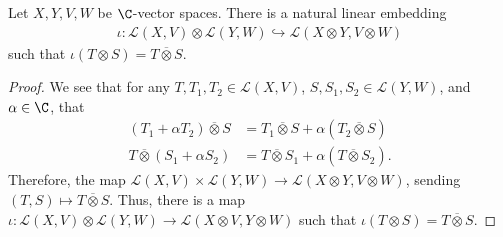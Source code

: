 \begin{proposition}
  Let $X,Y,V,W$ be $\C$-vector spaces. There is a natural linear embedding
  \begin{align*}
    \iota\colon \mathcal{L}\left( X,V \right)\otimes \mathcal{L}\left( Y,W \right) \hookrightarrow \mathcal{L}\left( X\otimes Y,V\otimes W \right)
  \end{align*}
  such that $\iota\left( T\otimes S \right) = T\overline{\otimes}S$.
\end{proposition}
\begin{proof}
  We see that for any $T,T_1,T_2\in \mathcal{L}\left( X,V \right)$, $S,S_1,S_2\in \mathcal{L} \left( Y,W \right)$, and $\alpha \in \C$, that
  \begin{align*}
    \left( T_1 + \alpha T_2 \right)\overline{\otimes}S &= T_1\overline{\otimes}S + \alpha \left( T_2\overline{\otimes}S \right)\\
    T\overline{\otimes}\left( S_1 + \alpha S_2 \right) &= T\overline{\otimes}S_1 + \alpha \left( T\overline{\otimes}S_2 \right).
  \end{align*}
  Therefore, the map $\mathcal{L}\left( X,V \right)\times \mathcal{L}\left( Y,W \right) \rightarrow \mathcal{L}\left( X\otimes Y,V\otimes W \right)$, sending $\left( T,S \right)\mapsto T\overline{\otimes}S$. Thus, there is a map $\iota\colon \mathcal{L}\left( X,V \right)\otimes \mathcal{L}\left( Y,W \right)\rightarrow \mathcal{L}\left( X\otimes V,Y\otimes W \right)$ such that $\iota\left( T\otimes S \right) = T\overline{\otimes}S$.\newline


\end{proof}
